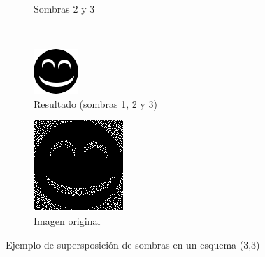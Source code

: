 \begin{figure}[Hp]
\begin{subfigure}[t]{0.3\textwidth}
		\caption{Sombras 2 y 3}
	\end{subfigure}
	\\
	\begin{subfigure}[t]{0.3\textwidth}
		\centering
		\includegraphics[width=\textwidth]{images/original}
		\caption{Resultado (sombras 1, 2 y 3)}
	\end{subfigure}
	\hspace{0.5cm}
	\begin{subfigure}[t]{0.3\textwidth}
		\centering
		\includegraphics[width=\textwidth]{images/result}
		\caption{Imagen original}
	\end{subfigure}
	\caption{Ejemplo de supersposición de sombras en un esquema (3,3)}
	\label{fig:ejemplo33}
\end{figure}

